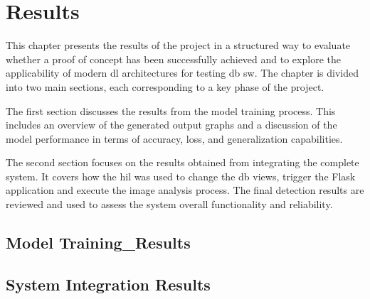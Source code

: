 \chapter{Results}

This chapter presents the results of the project in a structured way to evaluate whether a proof of concept has been successfully achieved and to explore the applicability of modern \gls{dl} architectures for testing \gls{db} \gls{sw}. The chapter is divided into two main sections, each corresponding to a key phase of the project.

The first section discusses the results from the model training process. This includes an overview of the generated output graphs and a discussion of the model performance in terms of accuracy, loss, and generalization capabilities.

The second section focuses on the results obtained from integrating the complete system. It covers how the \gls{hil} was used to change the \gls{db} views, trigger the Flask application and execute the image analysis process. The final detection results are reviewed and used to assess the system overall functionality and reliability.

\section{Model Training_Results}


\section{System Integration Results}

